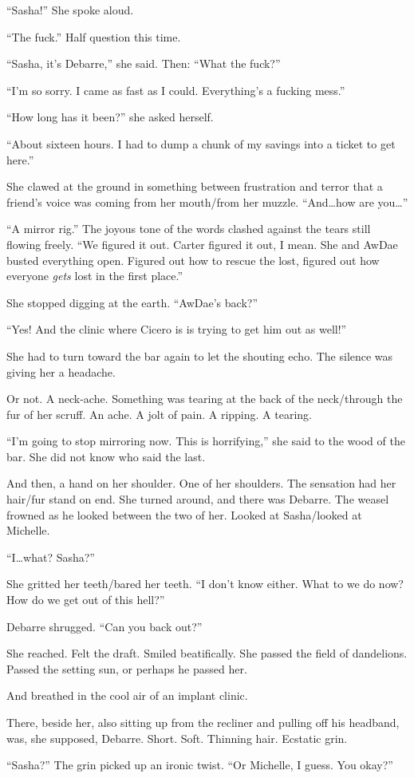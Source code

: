 ``Sasha!'' She spoke aloud.

``The fuck.'' Half question this time.

``Sasha, it's Debarre,'' she said. Then: ``What the fuck?''

``I'm so sorry. I came as fast as I could. Everything's a fucking mess.''

``How long has it been?'' she asked herself.

``About sixteen hours. I had to dump a chunk of my savings into a ticket to get here.''

She clawed at the ground in something between frustration and terror that a friend's voice was coming from her mouth/from her muzzle. ``And\ldots{}how are you\ldots{}''

``A mirror rig.'' The joyous tone of the words clashed against the tears still flowing freely. ``We figured it out. Carter figured it out, I mean. She and AwDae busted everything open. Figured out how to rescue the lost, figured out how everyone \emph{gets} lost in the first place.''

She stopped digging at the earth. ``AwDae's back?''

``Yes! And the clinic where Cicero is is trying to get him out as well!''

She had to turn toward the bar again to let the shouting echo. The silence was giving her a headache.

Or not. A neck-ache. Something was tearing at the back of the neck/through the fur of her scruff. An ache. A jolt of pain. A ripping. A tearing.

``I'm going to stop mirroring now. This is horrifying,'' she said to the wood of the bar. She did not know who said the last.

And then, a hand on her shoulder. One of her shoulders. The sensation had her hair/fur stand on end. She turned around, and there was Debarre. The weasel frowned as he looked between the two of her. Looked at Sasha/looked at Michelle.

``I\ldots{}what? Sasha?''

She gritted her teeth/bared her teeth. ``I don't know either. What to we do now? How do we get out of this hell?''

Debarre shrugged. ``Can you back out?''

She reached. Felt the draft. Smiled beatifically. She passed the field of dandelions. Passed the setting sun, or perhaps he passed her.

And breathed in the cool air of an implant clinic.

There, beside her, also sitting up from the recliner and pulling off his headband, was, she supposed, Debarre. Short. Soft. Thinning hair. Ecstatic grin.

``Sasha?'' The grin picked up an ironic twist. ``Or Michelle, I guess. You okay?''
